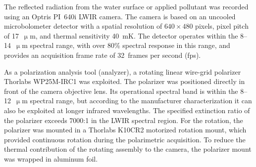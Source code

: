 \documentclass[pdflatex,sn-apa]{sn-jnl}
\begin{document}
 
The reflected radiation from the water surface or applied pollutant was recorded using an Optris PI~640i LWIR camera. The camera is based on an uncooled microbolometer detector with a spatial resolution of $640\times480$ pixels, pixel pitch of 17~$\upmu$m, and thermal sensitivity 40~mK. The detector operates within the 8--14~$\upmu$m spectral range, with over 80\% spectral response in this range, and provides an acquisition frame rate of 32~frames per second (fps).

As a polarization analysis tool (analyzer), a rotating linear wire-grid polarizer Thorlabs WP25M-IRC1 was exploited. The polarizer was positioned directly in front of the camera objective lens. Its operational spectral band is within the 8--12~$\upmu$m spectral range, but according to the manufacturer characterization it can also be exploited at longer infrared wavelengths. The specified extinction ratio of the polarizer exceeds 7000:1 in the LWIR spectral region. For the rotation, the polarizer was mounted in a Thorlabs K10CR2 motorized rotation mount, which provided continuous rotation during the polarimetric acquisition. To reduce the thermal contribution of the rotating assembly to the camera, the polarizer mount was wrapped in aluminum foil.
\end{document}
